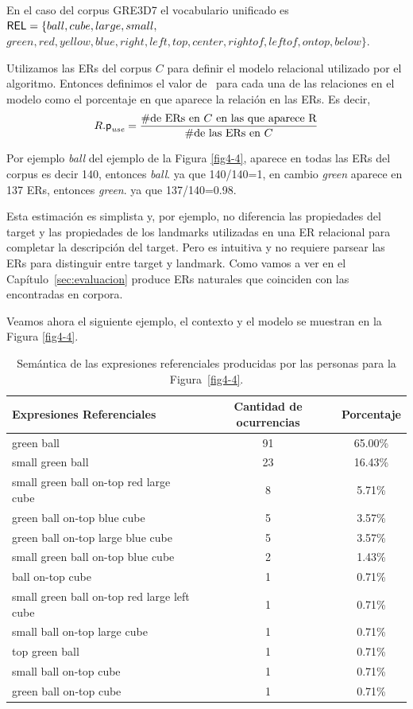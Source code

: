 En el caso del corpus GRE3D7 el vocabulario unificado es 
$\textsf{REL} = \{ball, cube, large, small,$\\
$green, red, yellow, blue, right, left, top, center, rightof, leftof, ontop,
below\} $.

 Utilizamos las ERs del corpus $C$
para definir el modelo relacional utilizado por el algoritmo. Entonces 
definimos el valor de \puse\ para cada una de las relaciones en el modelo como el
porcentaje en que aparece la relaci\'on en las ERs. Es decir,
\begin{equation} \label{eq1}
R.\textsf{p}_\textit{use} = \frac {\#\mbox{de ERs en $C$ en las que aparece R}} {\#\mbox{de las ERs en $C$}}
\end{equation}

Por ejemplo {\it ball} del ejemplo de la Figura \ref{fig4-4}, aparece en todas las ERs del corpus es decir 140, entonces {\it ball}. ya que 140/140=1, en cambio {\it green} aparece en 137 ERs, entonces {\it green}. ya que 137/140=0.98.

Esta estimaci\'on es simplista y, por ejemplo, no 
diferencia las propiedades del target y las propiedades de
los landmarks utilizadas en una ER relacional para completar la descripci\'on
del target. Pero es intuitiva y no requiere parsear las ERs para distinguir entre target y landmark. Como vamos a ver
en el Cap\'itulo~\ref{sec:evaluacion} produce ERs naturales
que coinciden con las encontradas en corpora.

Veamos ahora el siguiente ejemplo, el contexto y el modelo se muestran en la Figura \ref{fig4-4}.

\begin{table}[h!]
\begin{center}
\begin{tabular}{|l|c|c|}
\hline
Expresiones Referenciales & Cantidad de ocurrencias & Porcentaje \\
\hline

green ball & 91 & 65.00\% \\
small green ball   & 23 & 16.43\% \\
small green ball on-top red large cube & 8 & 5.71\% \\
green ball on-top blue cube & 5 & 3.57\% \\
green ball on-top large blue cube & 5 & 3.57\% \\
small green ball on-top blue cube & 2 & 1.43\% \\
ball on-top cube & 1 & 0.71\% \\
small green ball on-top red large left cube  & 1 & 0.71\% \\
small ball on-top large cube & 1 & 0.71\% \\
top green ball  & 1 & 0.71\% \\
small ball on-top cube & 1 & 0.71\% \\
green ball on-top cube & 1 & 0.71\% \\

\hline
\end{tabular}
\caption{Sem\'antica de las expresiones referenciales producidas por las personas para la Figura~\ref{fig4-4}.}\label{corpus-distribution}
\end{center}
\end{table}

